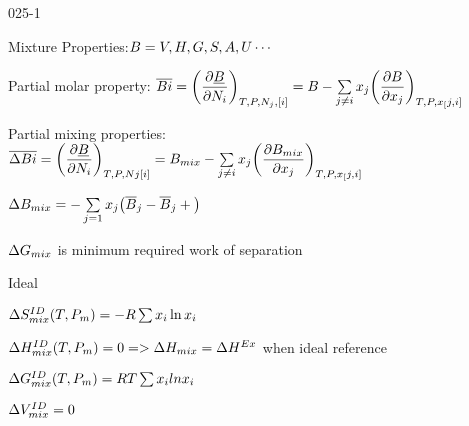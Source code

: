 \begin{mitframe}{025-1}

    
	\begin{listone}
    
          \item Mixture Properties:$\exergy=\vol,\enthalpy,\gibbs,\entropy,\helmholtz,\intenergy\cdots$
                   
			\item Partial molar property: $\overline{\biot}=\bigg(\dfrac{\partial\uline{\exergy}}{\partial\massspecflux{i}}\bigg)_{\Temp,\p,\nummoles_{j},[\state]}=\exergy-\sum\limits_{j \neq i}\specfrac{j}\bigg(\dfrac{\partial \exergy}{\partial\specfrac{j}}\bigg)_{\Temp,\p,\specfrac[j,\state]}$
          
         
    			\item Partial mixing properties: $\overline{\iipf\biot}=\bigg(\dfrac{\partial\uline{\exergy}}{\partial\massspecflux{i}}\bigg)_{\Temp,\p,\nummoles{j}[\state]}=\exergy_{\mixfunc}-\sum\limits_{j\neq i}\specfrac{j}\bigg(\dfrac{\partial\exergy_{\mixfunc}}{\partial\specfrac{j}}\bigg)_{\Temp,\p,\specfrac[j,\state]} $
    
    			\item $\iipf\exergy_{\mixfunc}=-\sum\limits_{j=1}\specfrac{j}\big(\overline{\exergy}_j-\overline{\exergy}_j+\big)$
    
    			\item $\iipf\gibbs_{\mixfunc}$ is minimum required work of separation
        
   				 \item Ideal

				\item $\iipf\entropy_{\mixfunc} ^{\mominertia\elecdisplace}(\Temp,\p_{\mass})=-\gasconst\sum\nolimits\specfrac{i}\ln\specfrac{i}$
    
    			\item $\iipf\enthalpy_{\mixfunc}^{\mominertia\elecdisplace}(\Temp,\p_{\mass})=0=>\iipf\enthalpy_{\mixfunc}=\iipf\enthalpy^{\energy\disp}$  when ideal reference %
     
          	\item $\iipf\gibbs_{\mixfunc}^{\mominertia\elecdisplace}(\Temp,\p_{\mass})=\gasconst\Temp\sum\nolimits\specfrac{i}ln\specfrac{i}$
    
   			 \item $\iipf\vol_{\mixfunc}^{\mominertia\elecdisplace}=0$
                   
\end{listone}			

\end{mitframe}